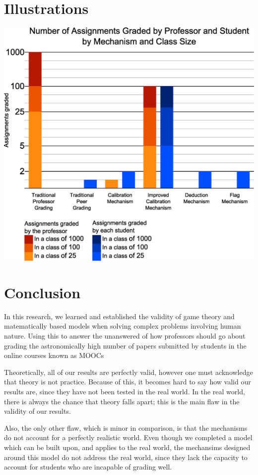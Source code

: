 \documentclass[12pt, Arial]{article}
\begin{document}
\section{Illustrations}
{
\noindent
\includegraphics[width=\textwidth]{Chart.eps}
}
\section{Conclusion}
In this research, we learned and established the validity of game theory and matematically based models when solving complex problems involving human nature. Using this to answer the unanswered of how professors should go about grading the astronomically high number of papers submitted by students in the online courses known as MOOCs

Theoretically, all of our results are perfectly valid, however one must acknowledge that theory is not practice. Because of this, it becomes hard to say how valid our results are, since they have not been tested in the real world. In the real world, there is always the chance that theory falls apart; this is the main flaw in the validity of our results.

Also, the only other flaw, which is minor in comparison, is that the mechanisms do not account for a perfectly realistic world. Even though we completed a model which can be built upon, and applies to the real world, the mechansims designed around this model do not address the real world, since they lack the capacity to account for students who are incapable of grading well.
\end{document}
